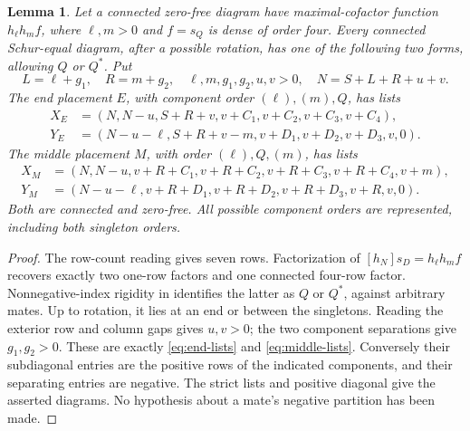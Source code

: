 \documentclass[11pt,a4paper]{amsart}
\numberwithin{equation}{section}
\theoremstyle{plain}
\newtheorem{lemma}[theorem]{Lemma}
\theoremstyle{definition}
\begin{document}
\begin{lemma}\label{lem:three-component-forms}
Let a connected zero-free diagram have maximal-cofactor function \(h_\ell h_m f\), where \(\ell,m>0\) and \(f=s_Q\) is dense of order four.  Every connected Schur-equal diagram, after a possible rotation, has one of the following two forms, allowing \(Q\) or \(Q^*\).  Put
\[
 L=\ell+g_1,\quad R=m+g_2,\quad
 \ell,m,g_1,g_2,u,v>0,\quad N=S+L+R+u+v.
\]
The end placement \(E\), with component order \((\ell),(m),Q\), has lists
\begin{equation}\label{eq:end-lists}
 \begin{aligned}
 X_E&=(N,N-u,S+R+v,v+C_1,v+C_2,v+C_3,v+C_4),\\
 Y_E&=(N-u-\ell,S+R+v-m,v+D_1,v+D_2,v+D_3,v,0).
 \end{aligned}
\end{equation}
The middle placement \(M\), with order \((\ell),Q,(m)\), has lists
\begin{equation}\label{eq:middle-lists}
 \begin{aligned}
 X_M&=(N,N-u,v+R+C_1,v+R+C_2,v+R+C_3,v+R+C_4,v+m),\\
 Y_M&=(N-u-\ell,v+R+D_1,v+R+D_2,v+R+D_3,v+R,v,0).
 \end{aligned}
\end{equation}
Both are connected and zero-free.  All possible component orders are represented, including both singleton orders.
\end{lemma}

\begin{proof}
The row-count reading gives seven rows.  Factorization of \([h_N]s_D=h_\ell h_m f\) recovers exactly two one-row factors and one connected four-row factor.  Nonnegative-index rigidity in \cite{Shields2026Cofactor} identifies the latter as \(Q\) or \(Q^*\), against arbitrary mates.  Up to rotation, it lies at an end or between the singletons.  Reading the exterior row and column gaps gives \(u,v>0\); the two component separations give \(g_1,g_2>0\).  These are exactly \eqref{eq:end-lists} and \eqref{eq:middle-lists}.  Conversely their subdiagonal entries are the positive rows of the indicated components, and their separating entries are negative.  The strict lists and positive diagonal give the asserted diagrams.  No hypothesis about a mate's negative partition has been made.
\end{proof}
\end{document}
